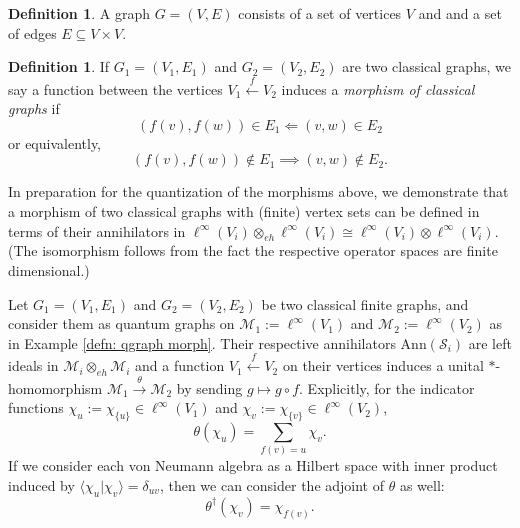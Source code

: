 \documentclass[12pt]{article}
\theoremstyle{definition}
\newtheorem{definition}[theorem]{Definition}
\newenvironment{remark}
  {\pushQED{\qed}\renewcommand{\qedsymbol}{\textcircled{\tiny R}}\remarkx}
  {\popQED\endremarkx}
\newcommand{\mc}[1]{\mathcal{#1}}
\newcommand{\<}{\langle}
\renewcommand{\>}{\rangle}
\newcommand{\Ann}{\text{Ann}}
\begin{document}
\begin{definition}
    A graph $G = (V,E)$ consists of a set of vertices $V$ and and a set of edges $E \subseteq V \times V$.
\end{definition}

\begin{definition}
    If $G_1 = (V_1, E_1)$ and $G_2 = (V_2, E_2)$ are two classical graphs, we say a function between the vertices $V_1 \overset{f}{\leftarrow} V_2$ induces a \textit{morphism of classical graphs} if
    \[
    (f(v),f(w)) \in E_1 \Longleftarrow (v,w) \in E_2
    \]
    or equivalently,
    \[
    (f(v),f(w)) \not\in E_1 \implies (v,w) \not\in E_2.
    \]
\end{definition}

In preparation for the quantization of the morphisms above, we demonstrate that a morphism of two classical graphs with (finite) vertex sets can be defined in terms of their annihilators in $\ell^\infty(V_i) \otimes_{eh} \ell^\infty(V_i) \cong \ell^\infty(V_i) \otimes \ell^\infty(V_i)$. (The isomorphism follows from the fact the respective operator spaces are finite dimensional.)

Let $G_1 = (V_1, E_1)$ and $G_2 = (V_2,E_2)$ be two classical finite graphs, and consider them as quantum graphs on $\mc M_1 := \ell^\infty(V_1)$ and $\mc M_2:= \ell^\infty(V_2)$ as in Example \ref{defn: qgraph morph}. Their respective annihilators $\Ann(\mc S_i)$ are left ideals in $\mc M_i \otimes_{eh} \mc M_i$ and a function $V_1 \overset{f}{\leftarrow} V_2$ on their vertices induces a unital $*$-homomorphism $\mc M_1 \overset{\theta}{\to} \mc M_2$ by sending $g \mapsto g \circ f$. Explicitly, for the indicator functions $\chi_u := \chi_{\{u\}} \in \ell^\infty(V_1)$ and $\chi_v := \chi_{\{v\}} \in \ell^\infty(V_2)$, 
\[
\theta(\chi_u) = \sum_{f(v) = u} \chi_v.
\]
If we consider each von Neumann algebra as a Hilbert space with inner product induced by $\<\chi_u|\chi_v\> = \delta_{uv}$, then we can consider the adjoint of $\theta$ as well:
\[
\theta^\dagger(\chi_v) = \chi_{f(v)}.
\]
\end{document}
